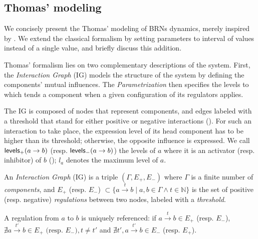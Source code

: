 \subsection{Thomas' modeling}
We concisely present the Thomas' modeling of BRNs dynamics, merely inspired by
\cite{Richard06,BernotSemBRN}.
We extend the classical formalism by setting parameters to interval of values instead of a single
value, and briefly discuss this addition.

Thomas' formalism lies on two complementary descriptions of the system. First, the
\emph{Interaction Graph} (IG) models the structure of the system by defining the components'
mutual influences.
The \emph{Parametrization} then specifies the levels to which tends a component when a given
configuration of its regulators applies.

The IG is composed of nodes that represent components, and edges labeled with a threshold that stand
for either positive or negative interactions ().
For such an interaction to take place, the expression level of its head component has to be higher than its threshold; otherwise, the opposite influence is expressed.
We call $\mathsf{levels}_+(a\rightarrow b)$ (resp. $\mathsf{levels}_-(a\rightarrow b)$) the levels of $a$ where it is an
activator (resp. inhibitor) of $b$ ();
$l_a$ denotes the maximum level of $a$.

\begin{definition}
\label{def:ig}
An \emph{Interaction Graph} (IG) is a triple $(\Gamma, E_+, E_-)$ where $\Gamma$ is a finite number of \emph{components},
and $E_+$ (resp. $E_-$) $\subset \{a \xrightarrow{t} b \mid a, b \in \Gamma \wedge t \in \mathbb{N}\}$
is the set of positive (resp. negative) \emph{regulations} between two nodes, labeled with a \emph{threshold}.

A regulation from $a$ to $b$ is uniquely referenced:
if $a \xrightarrow{t} b \in E_+$ (resp. $E_-$),
$\nexists a \xrightarrow{t'} b \in E_+ \text{ (resp. $E_-$)}, t \neq t'$
and $\nexists t', a \xrightarrow{t'} b \in E_-$ (resp. $E_+$).
\end{definition}

